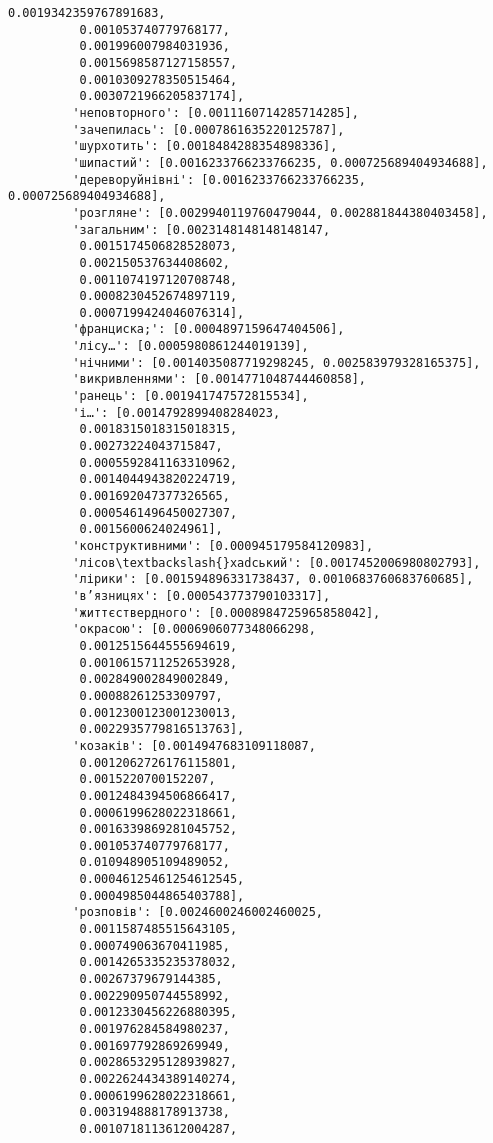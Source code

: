 \documentclass[11pt]{article}
\begin{document}
\begin{Verbatim}[commandchars=\\\{\}]
          0.0019342359767891683,
          0.001053740779768177,
          0.001996007984031936,
          0.0015698587127158557,
          0.0010309278350515464,
          0.0030721966205837174],
         'неповторного': [0.0011160714285714285],
         'зачепилась': [0.0007861635220125787],
         'шурхотить': [0.0018484288354898336],
         'шипастий': [0.0016233766233766235, 0.000725689404934688],
         'дереворуйнівні': [0.0016233766233766235, 0.000725689404934688],
         'розгляне': [0.0029940119760479044, 0.002881844380403458],
         'загальним': [0.0023148148148148147,
          0.0015174506828528073,
          0.002150537634408602,
          0.0011074197120708748,
          0.0008230452674897119,
          0.0007199424046076314],
         'франциска;': [0.0004897159647404506],
         'лісу…': [0.0005980861244019139],
         'нічними': [0.0014035087719298245, 0.002583979328165375],
         'викривленнями': [0.0014771048744460858],
         'ранець': [0.001941747572815534],
         'і…': [0.0014792899408284023,
          0.0018315018315018315,
          0.00273224043715847,
          0.0005592841163310962,
          0.0014044943820224719,
          0.001692047377326565,
          0.0005461496450027307,
          0.0015600624024961],
         'конструктивними': [0.000945179584120983],
         'лісов\textbackslash{}xadський': [0.0017452006980802793],
         'лірики': [0.001594896331738437, 0.0010683760683760685],
         'в’язницях': [0.000543773790103317],
         'життєствердного': [0.0008984725965858042],
         'окрасою': [0.0006906077348066298,
          0.0012515644555694619,
          0.0010615711252653928,
          0.002849002849002849,
          0.00088261253309797,
          0.0012300123001230013,
          0.0022935779816513763],
         'козаків': [0.0014947683109118087,
          0.0012062726176115801,
          0.0015220700152207,
          0.0012484394506866417,
          0.0006199628022318661,
          0.0016339869281045752,
          0.001053740779768177,
          0.010948905109489052,
          0.00046125461254612545,
          0.0004985044865403788],
         'розповів': [0.0024600246002460025,
          0.0011587485515643105,
          0.000749063670411985,
          0.0014265335235378032,
          0.00267379679144385,
          0.002290950744558992,
          0.0012330456226880395,
          0.001976284584980237,
          0.001697792869269949,
          0.0028653295128939827,
          0.0022624434389140274,
          0.0006199628022318661,
          0.003194888178913738,
          0.0010718113612004287,

\end{Verbatim}
\end{document}
